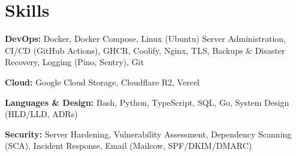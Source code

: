 \documentclass[10pt, a4paper]{article}
\begin{document}
\section{Skills}
\textbf{DevOps:} Docker, Docker Compose, Linux (Ubuntu) Server Administration, CI/CD (GitHub Actions), GHCR, Coolify, Nginx, TLS, Backups \& Disaster Recovery, Logging (Pino, Sentry), Git\par
\textbf{Cloud:} Google Cloud Storage, Cloudflare R2, Vercel\par
\textbf{Languages \& Design:} Bash, Python, TypeScript, SQL, Go, System Design (HLD/LLD, ADRs)\par
\textbf{Security:} Server Hardening, Vulnerability Assessment, Dependency Scanning (SCA), Incident Response, Email (Mailcow, SPF/DKIM/DMARC)
\end{document}
